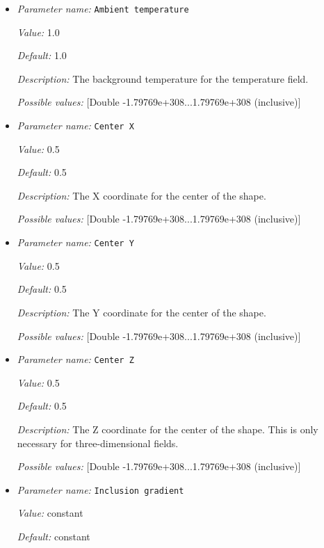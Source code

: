 \begin{itemize}
\item {\it Parameter name:} {\tt Ambient temperature}


{\it Value:} 1.0


{\it Default:} 1.0


{\it Description:} The background temperature for the temperature field.


{\it Possible values:} [Double -1.79769e+308...1.79769e+308 (inclusive)]
\item {\it Parameter name:} {\tt Center X}


{\it Value:} 0.5


{\it Default:} 0.5


{\it Description:} The X coordinate for the center of the shape.


{\it Possible values:} [Double -1.79769e+308...1.79769e+308 (inclusive)]
\item {\it Parameter name:} {\tt Center Y}


{\it Value:} 0.5


{\it Default:} 0.5


{\it Description:} The Y coordinate for the center of the shape.


{\it Possible values:} [Double -1.79769e+308...1.79769e+308 (inclusive)]
\item {\it Parameter name:} {\tt Center Z}


{\it Value:} 0.5


{\it Default:} 0.5


{\it Description:} The Z coordinate for the center of the shape. This is only necessary for three-dimensional fields.


{\it Possible values:} [Double -1.79769e+308...1.79769e+308 (inclusive)]
\item {\it Parameter name:} {\tt Inclusion gradient}


{\it Value:} constant


{\it Default:} constant



\end{itemize}
